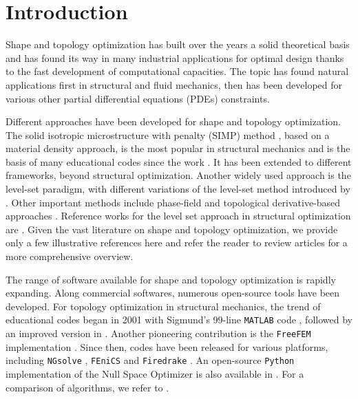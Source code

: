 \documentclass[iicol,pdflatex,sn-mathphys-ay]{sn-jnl}%
\theoremstyle{thmstyleone}%
\theoremstyle{thmstyletwo}%
\theoremstyle{thmstylethree}%
\begin{document}



\maketitle

\section{Introduction}

Shape and topology optimization \citep{MR2731611,MR1215733} has built
over the years a solid theoretical basis and has
found its way in many industrial applications for optimal design
thanks to the fast development of computational capacities. 
The topic has found natural applications first  in structural
and fluid mechanics, then has been developed for various other
partial differential equations (PDEs) constraints. 

Different approaches have been developed for shape and topology optimization. 
The solid isotropic microstructure with penalty (SIMP) method \citep{MR2008524},
based on a material density approach,
is the most popular in structural mechanics and is the basis of
many educational codes since the work \citep{Sigmund2014}. 
It has been extended to different frameworks, beyond structural optimization.
Another widely used approach is the level-set paradigm, with different
variations of the level-set method introduced by \cite{MR965860}. 
Other important methods include phase-field \citep{MR2108636} and
topological derivative-based approaches \citep{MR2235384}. 
Reference works for the level set approach in structural
optimization are \citep{MR1911658,MR2033390}. 
Given the vast literature on shape and topology optimization,
we provide only a few illustrative references here and refer the
reader to review articles for a more comprehensive overview. 

The range of software available for shape and topology
optimization is rapidly expanding.
Along commercial softwares, numerous open-source tools have been developed.
For topology optimization in structural mechanics,
the trend of educational codes began in 2001 with Sigmund's 99-line
\texttt{MATLAB} code \citep{Sigmund2014},
followed by an improved version in \cite{Andreassen2010}.
Another pioneering contribution is the \texttt{FreeFEM} implementation \citep{MR2252743}.
Since then, codes have been released for various platforms,
including \texttt{NGsolve} \citep{MR4233697}, \texttt{FEniCS}
\citep{fenicsx, BLAUTH2021100646,MR3843884}
and \texttt{Firedrake} \citep{MR4244971}. 
An open-source \texttt{Python} implementation of
the Null Space Optimizer is also available in \cite{MR4686093}.
For a comparison of algorithms, we refer to \cite{Gain2013}.
 
\end{document}
